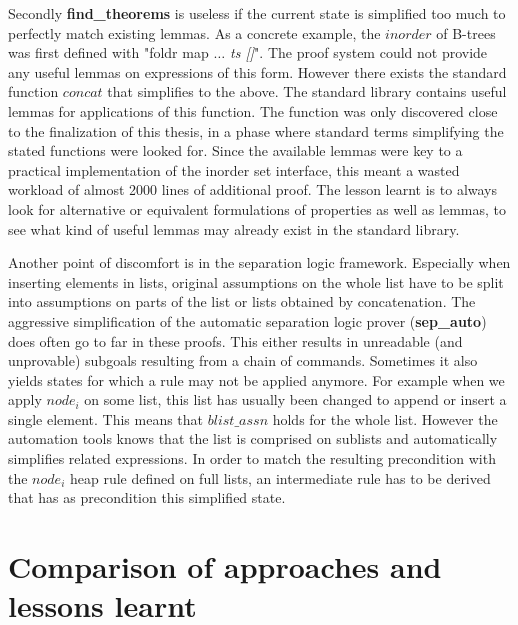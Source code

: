 Secondly \textbf{find\_theorems} is useless if the current state
is simplified too much to perfectly match existing lemmas.
As a concrete example, the $inorder$ of B-trees was first defined
with "foldr map \textit{$\dots$ ts []}".
The proof system could not provide any useful lemmas on expressions of this form.
However there exists the standard function $concat$ that
simplifies to the above.
The standard library contains useful lemmas for applications of this function.
The function was only discovered close to the finalization of this thesis,
in a phase where standard terms simplifying the stated functions were looked for.
Since the available lemmas were key to a practical
implementation of the inorder set interface,
this meant a wasted workload of almost 2000 lines of additional proof.
The lesson learnt is to always look for alternative or equivalent
formulations of properties as well as lemmas,
to see what kind of useful lemmas may already exist in the standard library.

Another point of discomfort is in the separation logic framework.
Especially when inserting elements in lists,
original assumptions on the whole list have to be split
into assumptions on parts of the list or lists obtained by concatenation.
The aggressive simplification of the automatic
separation logic prover (\textbf{sep\_auto})
does often go to far in these proofs.
This either results in unreadable (and unprovable)
subgoals resulting from a chain of commands.
Sometimes it also yields states for which a rule
may not be applied anymore.
For example when we apply $node_i$ on some list,
this list has usually been changed to append or insert a single element.
This means that $blist\_assn$ holds for the whole list.
However the automation tools knows that the list
is comprised on sublists and automatically simplifies related expressions.
In order to match the resulting precondition with the $node_i$ heap rule
defined on full lists, an intermediate rule has to be derived
that has as precondition this simplified state.




\section{Comparison of approaches and lessons learnt}

